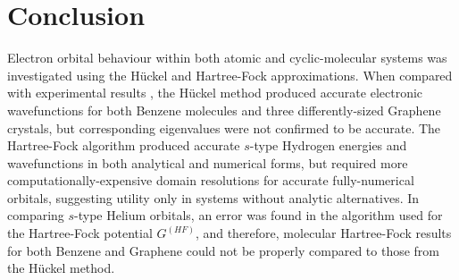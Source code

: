 \chapter{Conclusion}\label{ch:conclusion}

Electron orbital behaviour within both atomic and cyclic-molecular systems was investigated using the Hückel and Hartree-Fock approximations. When compared with experimental results \cite{szwacki_aromatic_2009}\cite{neto_electronic_2009}, the Hückel method produced accurate electronic wavefunctions for both Benzene molecules and three differently-sized Graphene crystals, but corresponding eigenvalues were not confirmed to be accurate. The Hartree-Fock algorithm \cite{laaksonen_fully_1986}\cite{quiney_art_nodate} produced accurate $s$-type Hydrogen energies and wavefunctions in both analytical and numerical forms, but required more computationally-expensive domain resolutions for accurate fully-numerical orbitals, suggesting utility only in systems without analytic alternatives. In comparing $s$-type Helium orbitals, an error was found in the algorithm used for the Hartree-Fock potential $G^{(HF)}$, and therefore, molecular Hartree-Fock results for both Benzene and Graphene could not be properly compared to those from the Hückel method.